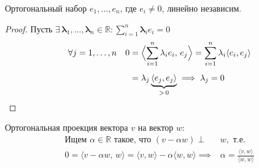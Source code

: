 \begin{stmt}
    Ортогональный набор $e_1, \dots, e_n$, где $e_i \neq 0$, линейно независим.
    \begin{proof}
        Пусть $\exists\, \mathbf{\lambda}_1, \dots, \mathbf{\lambda}_n \in \mathbb{R} : \sum_{i=1}^{n} \mathbf{\lambda}_i e_i = 0$
        \begin{align*}
            \forall j = 1,\dots,n \quad
            0 &= \Bigl\langle \sum_{i=1}^{n}\mathbf{\lambda}_i e_i,\, e_j\Bigr\rangle
               = \sum_{i=1}^{n} \mathbf{\lambda}_i \langle e_i, e_j\rangle \\[4pt]
              &= \mathbf{\lambda}_j \underbrace{\langle e_j, e_j\rangle}_{>\,0}
               \implies \mathbf{\lambda}_j = 0
        \end{align*}
    \end{proof}
\end{stmt}


\begin{definition}
    Ортогональная проекция вектора $v$ на вектор $w$:
    \begin{align*}
        \text{Ищем } \alpha \in \mathbb{R} \text{ такое, что } (v - \alpha w) \perp &w, \text{ т.е.}\\[4pt]
        0 = \langle v - \alpha w,\, w \rangle
           = \langle v, w \rangle - \alpha\langle w, w \rangle
          \implies &\alpha = \frac{\langle v, w \rangle}{\langle w, w \rangle}
    \end{align*}
    \begin{center}

    \end{center}
\end{definition}


